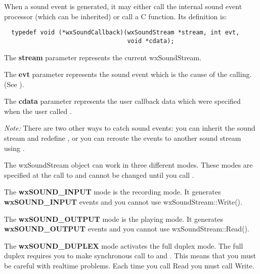 When a sound event is generated, it may either call the internal sound event 
processor (which can be inherited) or call a C function. Its definition is:

\begin{verbatim}
  typedef void (*wxSoundCallback)(wxSoundStream *stream, int evt,
                                  void *cdata);
\end{verbatim}

The {\bf stream} parameter represents the current wxSoundStream.

The {\bf evt} parameter represents the sound event which is the cause of the calling. (See ).

The {\bf cdata} parameter represents the user callback data which were specified
when the user called .

{\it Note:} There are two other ways to catch sound events: you can inherit the
sound stream and redefine , or you can reroute the events to another sound stream using .



The wxSoundStream object can work in three different modes. These modes are specified
at the call to  
and cannot be changed until you call 
.

The {\bf wxSOUND\_INPUT} mode is the recording mode. It generates {\bf wxSOUND\_INPUT} 
events and you cannot use wxSoundStream::Write().

The {\bf wxSOUND\_OUTPUT} mode is the playing mode. It generates {\bf wxSOUND\_OUTPUT} 
events and you cannot use wxSoundStream::Read().

The {\bf wxSOUND\_DUPLEX} mode activates the full duplex mode. The full duplex requires
you to make synchronous call to  and 
. This means that you must be
careful with realtime problems. Each time you call Read you must call Write.



